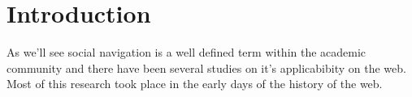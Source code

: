 \chapter{Introduction}

%
%
%
% 
%
% 


As we'll see social navigation is a well defined term within the academic
community and there have been several studies on it's applicabibity on the
web. Most of this research took place in the early days of the history of the
web.
